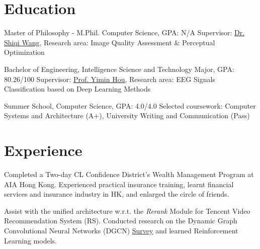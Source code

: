 \documentclass{my_cv}
\begin{document}
\hspace*{\fill}


\hspace*{\fill}


\hspace*{\fill} 

\section{Education}
\workitemstwo
{Master of Philosophy - M.Phil. Computer Science, GPA: N/A}
{Supervisor: \href{mailto:shiqwang@cityu.edu.hk}{Dr. Shiqi Wang}, Research area: Image Quality Assessment \& Perceptual Optimization}

\workitemstwo
{Bachelor of Engineering, Intelligence Science and Technology Major, GPA: 80.26/100}
{Supervisor: \href{mailto:ymh7821@163.com}{Prof. Yimin Hou}, Research area: EEG Signals Classification based on Deep Learning Methods}

\workitemstwo
{Summer School, Computer Science, GPA: 4.0/4.0}
{Selected coursework: Computer Systems and Architecture (A+), University Writing and Communication (Pass)}

\hspace*{\fill} 

\section{Experience}
\workitemstwo
{Completed a Two-day CL Confidence District's Wealth Management Program at AIA Hong Kong.}
{Experienced practical insurance training, learnt financial services and insurance industry in HK, and enlarged the circle of friends.}

\workitemstwo
{Assist with the unified architecture w.r.t. the \emph{Rerank} Module for Tencent Video Recommendation System (RS).}
{Conducted research on the Dynamic Graph Convolutional Neural Networks (DGCN) \href{https://shuyuej.com/files/Dynamic-GCN-Survey.pdf}{Survey} and learned Reinforcement Learning models.}
\end{document}
